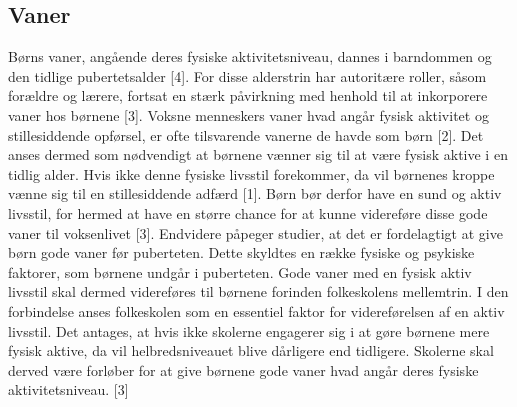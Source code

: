 \subsection{Vaner}
Børns vaner, angående deres fysiske aktivitetsniveau, dannes i barndommen og den tidlige pubertetsalder [4]. For disse alderstrin har autoritære roller, såsom forældre og lærere, fortsat en stærk påvirkning med henhold til at inkorporere vaner hos børnene [3]. \newline
Voksne menneskers vaner hvad angår fysisk aktivitet og stillesiddende opførsel, er ofte tilsvarende vanerne de havde som børn [2]. Det anses dermed som nødvendigt at børnene vænner sig til at være fysisk aktive i en tidlig alder. Hvis ikke denne fysiske livsstil forekommer, da vil børnenes kroppe vænne sig til en stillesiddende adfærd [1]. \newline
Børn bør derfor have en sund og aktiv livsstil, for hermed at have en større chance for at kunne videreføre disse gode vaner til voksenlivet [3]. Endvidere påpeger studier, at det er fordelagtigt at give børn gode vaner før puberteten. Dette skyldtes en række fysiske og psykiske faktorer, som børnene undgår i puberteten. Gode vaner med en fysisk aktiv livsstil skal dermed videreføres til børnene forinden folkeskolens mellemtrin. I den forbindelse anses folkeskolen som en essentiel faktor for videreførelsen af en aktiv livsstil. Det antages, at hvis ikke skolerne engagerer sig i at gøre børnene mere fysisk aktive, da vil helbredsniveauet blive dårligere end tidligere. Skolerne skal derved være forløber for at give børnene gode vaner hvad angår deres fysiske aktivitetsniveau. [3]

